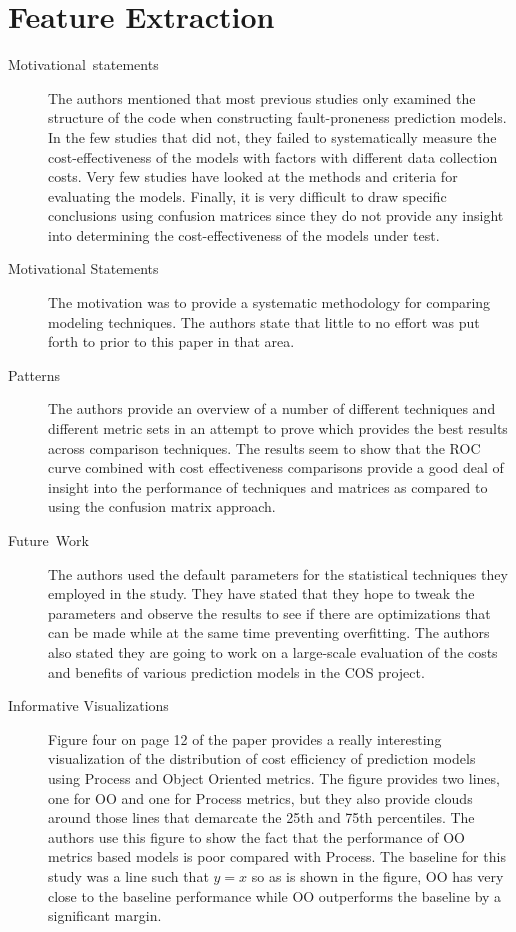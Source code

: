 \documentclass[english]{article}
\begin{document}
\section*{Feature Extraction}
\begin{description}
\item [{Motivational~statements}] The authors mentioned that most previous
studies only examined the structure of the code when constructing
fault-proneness prediction models. In the few studies that did not,
they failed to systematically measure the cost-effectiveness of the
models with factors with different data collection costs. Very few
studies have looked at the methods and criteria for evaluating the
models. Finally, it is very difficult to draw specific conclusions
using confusion matrices since they do not provide any insight into
determining the cost-effectiveness of the models under test. 
\item [{Motivational Statements}] The motivation was to provide a systematic
methodology for comparing modeling techniques. The authors state that
little to no effort was put forth to prior to this paper in that area. 
\item [{Patterns}] The authors provide an overview of a number of different
techniques and different metric sets in an attempt to prove which
provides the best results across comparison techniques. The results
seem to show that the ROC curve combined with cost effectiveness comparisons
provide a good deal of insight into the performance of techniques
and matrices as compared to using the confusion matrix approach. 
\item [{Future~Work}] The authors used the default parameters for the
statistical techniques they employed in the study. They have stated
that they hope to tweak the parameters and observe the results to
see if there are optimizations that can be made while at the same
time preventing overfitting. The authors also stated they are going
to work on a large-scale evaluation of the costs and benefits of various
prediction models in the COS project. 
\item [{Informative Visualizations}] Figure four on page 12 of the paper
provides a really interesting visualization of the distribution of
cost efficiency of prediction models using Process and Object Oriented
metrics. The figure provides two lines, one for OO and one for Process
metrics, but they also provide clouds around those lines that demarcate
the 25th and 75th percentiles. The authors use this figure to show
the fact that the performance of OO metrics based models is poor compared
with Process. The baseline for this study was a line such that $y=x$
so as is shown in the figure, OO has very close to the baseline performance
while OO outperforms the baseline by a significant margin. 
\end{description}
\end{document}
